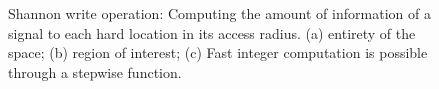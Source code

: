 \begin{figure}[h!]
  \centering



  \caption{Shannon write operation:  Computing the amount of information of a signal to each hard location in its access radius. (a) entirety of the space; (b) region of interest; (c) Fast integer computation is possible through a stepwise function.}
  \label{fig:info-theory-hypothesis}
\end{figure}



